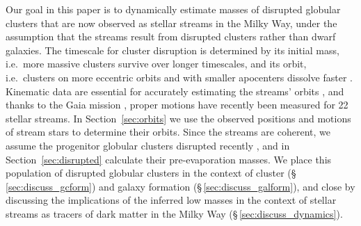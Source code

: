 \documentclass[twocolumn]{aastex63}
\newcommand{\msun}{\ensuremath{\textrm{M}_\odot}}
\begin{document}
Our goal in this paper is to dynamically estimate masses of disrupted globular clusters that are now observed as stellar streams in the Milky Way, under the assumption that the streams result from disrupted clusters rather than dwarf galaxies.
The timescale for cluster disruption is determined by its initial mass, i.e.\ more massive clusters survive over longer timescales, and its orbit, i.e.\ clusters on more eccentric orbits and with smaller apocenters dissolve faster \citep{baumgardt03,kruijssen09}.
Kinematic data are essential for accurately estimating the streams' orbits \citep{bh:2018}, and thanks to the Gaia mission \citep{gdr2}, proper motions have recently been measured for 22 stellar streams.
In Section~\ref{sec:orbits} we use the observed positions and motions of stream stars to determine their orbits.
Since the streams are coherent, we assume the progenitor globular clusters disrupted recently \citep{helmi:2003}, and in Section~\ref{sec:disrupted} calculate their pre-evaporation masses.
We place this population of disrupted globular clusters in the context of cluster (\S\,\ref{sec:discuss_gcform}) and galaxy formation (\S\,\ref{sec:discuss_galform}), and close by discussing the implications of the inferred low masses in the context of stellar streams as tracers of dark matter in the Milky Way (\S\,\ref{sec:discuss_dynamics}).

% 


% 
\end{document}
